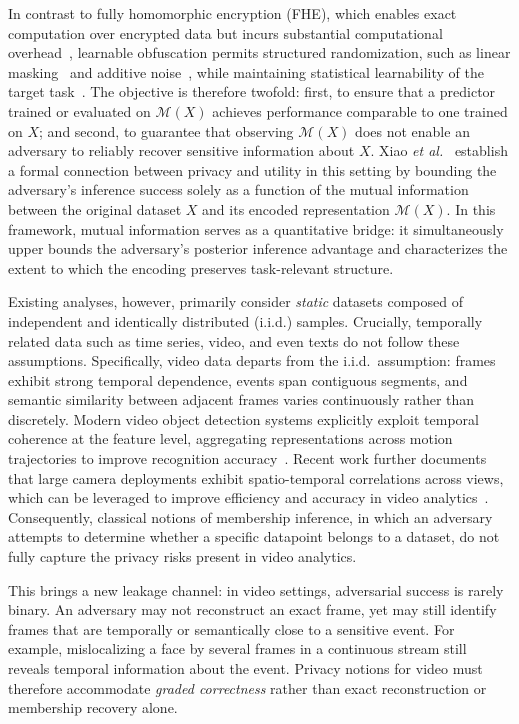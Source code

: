 \documentclass[sigconf,anonymous, review]{acmart}
\begin{document}
In contrast to fully homomorphic encryption (FHE), which enables exact computation over encrypted data but incurs substantial computational overhead~\cite{gentry2009fhe,gorantala2023fhe}, learnable obfuscation permits structured randomization, such as linear masking~\cite{yala2021neuracrypt} and additive noise~\cite{xiao2025one}, while maintaining statistical learnability of the target task~\cite{xiao2023pacprivacy,xiao2024formal}. The objective is therefore twofold: first, to ensure that a predictor trained or evaluated on $\mathcal{M}(X)$ achieves performance comparable to one trained on $X$; and second, to guarantee that observing $\mathcal{M}(X)$ does not enable an adversary to reliably recover sensitive information about $X$. Xiao \textit{et al.}~\cite{xiao2024formal} establish a formal connection between privacy and utility in this setting by bounding the adversary's inference success solely as a function of the mutual information between the original dataset $X$ and its encoded representation $\mathcal{M}(X)$. In this framework, mutual information serves as a quantitative bridge: it simultaneously upper bounds the adversary's posterior inference advantage and characterizes the extent to which the encoding preserves task-relevant structure.

Existing analyses, however, primarily consider \textit{static} datasets composed of independent and identically distributed (i.i.d.) samples. Crucially, temporally related data such as time series, video, and even texts do not follow these assumptions. Specifically, video data departs from the i.i.d.\ assumption: frames exhibit strong temporal dependence, events span contiguous segments, and semantic similarity between adjacent frames varies continuously rather than discretely. Modern video object detection systems explicitly exploit temporal coherence at the feature level, aggregating representations across motion trajectories to improve recognition accuracy~\cite{zhu2017flow}. Recent work further documents that large camera deployments exhibit spatio-temporal correlations across views, which can be leveraged to improve efficiency and accuracy in video analytics~\cite{jain2019scaling}. Consequently, classical notions of membership inference, in which an adversary attempts to determine whether a specific datapoint belongs to a dataset, do not fully capture the privacy risks present in video analytics.

This brings a new leakage channel: in video settings, adversarial success is rarely binary. An adversary may not reconstruct an exact frame, yet may still identify frames that are temporally or semantically close to a sensitive event. For example, mislocalizing a face by several frames in a continuous stream still reveals temporal information about the event. Privacy notions for video must therefore accommodate \emph{graded correctness} rather than exact reconstruction or membership recovery alone.
\end{document}
